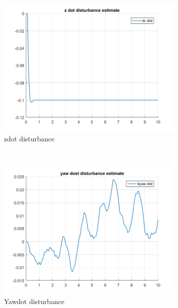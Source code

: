 \documentclass[11pt]{article}
\begin{document}
\begin{enumerate}
\begin{figure}[ht]
        \begin{subfigure}[c]{0.3\linewidth}
            \centering
            \includegraphics[width=\linewidth]{Plots_14_SlewRateConstraints/08}
            \caption{zdot disturbance}
        \end{subfigure}
        ~
        \begin{subfigure}[c]{0.3\linewidth}
            \centering
            \includegraphics[width=\linewidth]{Plots_14_SlewRateConstraints/09}
            \caption{Yawdot disturbance}
        \end{subfigure}
        ~
        \begin{subfigure}[c]{0.3\linewidth}
            \centering

\end{subfigure}
\end{figure}
\end{enumerate}
\end{document}
